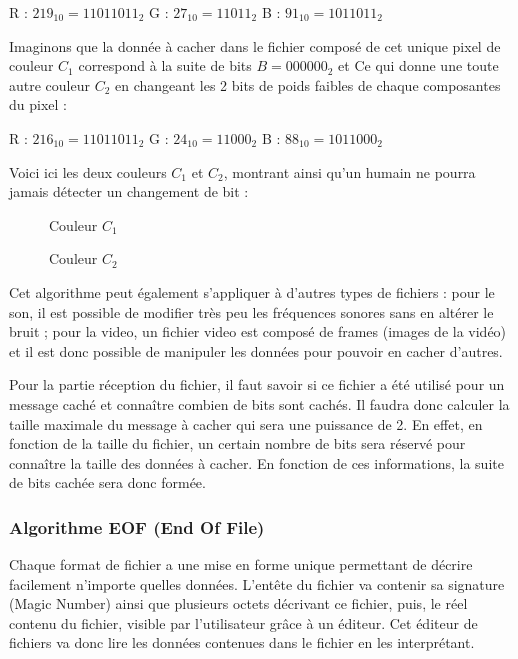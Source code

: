 \documentclass[11pt]{article}
\begin{document}
R : $219_{10} = 11011011_2$	\qquad G : $27_{10} = 11011_2$ \qquad B : $91_{10} = 1011011_2$


Imaginons que la donnée à cacher dans le fichier composé de cet unique pixel de couleur $C_1$ correspond à la suite de bits $B = 000000_2$ et
Ce qui donne une toute autre couleur $C_2$ en changeant les 2 bits de poids faibles de chaque composantes du pixel : 

R : $216_{10} = 11011011_2$ \qquad G : $24_{10} = 11000_2$ \qquad B : $88_{10} = 1011000_2$


Voici ici les deux couleurs $C_1$ et $C_2$, montrant ainsi qu'un humain ne pourra jamais détecter un changement de bit : 

\begin{figure}[h]
 \begin{minipage}{.46\linewidth}
  \centering{}
  \caption{Couleur $C_1$}
 \end{minipage} \hfill
 \begin{minipage}{.46\linewidth}
  \centering{}
  \caption{Couleur $C_2$}
 \end{minipage}
\end{figure}

Cet algorithme peut également s'appliquer à d'autres types de fichiers : pour le son, il est possible de modifier très peu les fréquences sonores sans en altérer le bruit ; 
pour la video, un fichier video est composé de frames (images de la vidéo) et il est donc possible de manipuler les données pour pouvoir en cacher d'autres. 

Pour la partie réception du fichier, il faut savoir si ce fichier a été utilisé pour un message caché et connaître combien de bits sont cachés. 
Il faudra donc calculer la taille maximale du message à cacher qui sera une puissance de 2. En effet, en fonction de la taille du fichier, un certain nombre de bits sera réservé pour connaître la taille 
des données à cacher. 
En fonction de ces informations, la suite de bits cachée sera donc formée.

\subsubsection{Algorithme EOF (End Of File)}
Chaque format de fichier a une mise en forme unique permettant de décrire facilement n'importe quelles données. 
L'entête du fichier va contenir sa signature (Magic Number) ainsi que plusieurs octets décrivant ce fichier, puis, le réel contenu du fichier, visible par l'utilisateur grâce à un éditeur. 
Cet éditeur de fichiers va donc lire les données contenues dans le fichier en les interprétant. 
\end{document}
